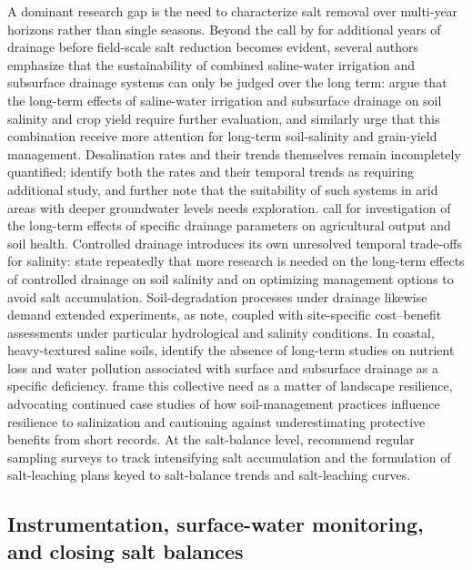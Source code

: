 A dominant research gap is the need to characterize salt removal over multi-year horizons rather than single seasons. Beyond the call by \textcite{Almen2021} for additional years of drainage before field-scale salt reduction becomes evident, several authors emphasize that the sustainability of combined saline-water irrigation and subsurface drainage systems can only be judged over the long term: \textcite{Feng2017} argue that the long-term effects of saline-water irrigation and subsurface drainage on soil salinity and crop yield require further evaluation, and \textcite{Feng2021} similarly urge that this combination receive more attention for long-term soil-salinity and grain-yield management. Desalination rates and their trends themselves remain incompletely quantified; \textcite{Guo2024b} identify both the rates and their temporal trends as requiring additional study, and further note that the suitability of such systems in arid areas with deeper groundwater levels needs exploration. \textcite{Yao2024} call for investigation of the long-term effects of specific drainage parameters on agricultural output and soil health. Controlled drainage introduces its own unresolved temporal trade-offs for salinity: \textcite{Jouni2018} state repeatedly that more research is needed on the long-term effects of controlled drainage on soil salinity and on optimizing management options to avoid salt accumulation. Soil-degradation processes under drainage likewise demand extended experiments, as \textcite{Lu2019} note, coupled with site-specific cost--benefit assessments under particular hydrological and salinity conditions. In coastal, heavy-textured saline soils, \textcite{Islam2025} identify the absence of long-term studies on nutrient loss and water pollution associated with surface and subsurface drainage as a specific deficiency. \textcite{Daigh2025} frame this collective need as a matter of landscape resilience, advocating continued case studies of how soil-management practices influence resilience to salinization and cautioning against underestimating protective benefits from short records. At the salt-balance level, \textcite{Heng2021} recommend regular sampling surveys to track intensifying salt accumulation and the formulation of salt-leaching plans keyed to salt-balance trends and salt-leaching curves.

\subsection{Instrumentation, surface-water monitoring, and closing salt balances}

